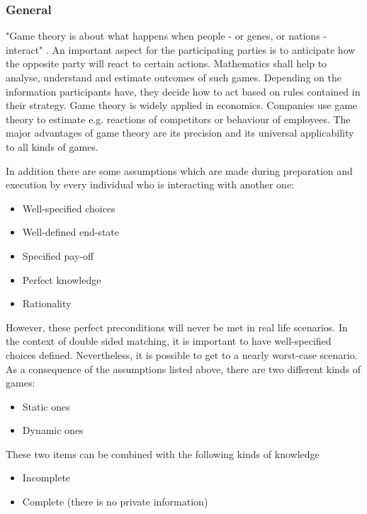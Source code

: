 \subsubsection{General}
"Game theory is about what happens when people - or genes, or nations - interact" \cite[p. 1]{camerer2003behavioral}.
An important aspect for the participating parties is to anticipate how the opposite party will react to certain actions.
Mathematics shall help to analyse, understand and estimate outcomes of such games. 
Depending on the information participants have, they decide how to act based on rules contained in their strategy.
Game theory is widely applied in economics.
Companies use game theory to estimate e.g. reactions of competitors or behaviour of employees.
The major advantages of game theory are its precision and its universal applicability to all kinds of games. \cite[pp. 1-3]{camerer2003behavioral}

In addition there are some assumptions which are made during preparation and execution by every individual who is interacting with another one:
\begin{itemize}
	\item Well-specified choices
	\item Well-defined end-state
	\item Specified pay-off
	\item Perfect knowledge
	\item Rationality 
\end{itemize}

However, these perfect preconditions will never be met in real life scenarios. 
In the context of double sided matching, it is important to have well-specified choices defined. 
Nevertheless, it is possible to get to a nearly worst-case scenario.
As a consequence of the assumptions listed above, there are two different kinds of games:
 
\begin{itemize}
	\item Static ones
	\item Dynamic ones
\end{itemize}

These two items can be combined with the following kinds of knowledge

\begin{itemize}
	\item Incomplete
	\item Complete (there is no private information)
\end{itemize}


